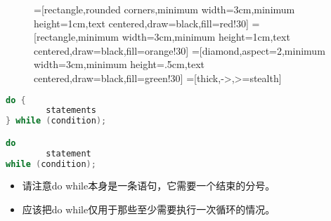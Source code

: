 \begin{frame}[fragile]\ft{\secname}
\begin{figure}
\centering
{}=[rectangle,rounded corners,minimum width=3cm,minimum height=1cm,text centered,draw=black,fill=red!30]
=[rectangle,minimum width=3cm,minimum height=1cm,text centered,draw=black,fill=orange!30]
=[diamond,aspect=2,minimum width=3cm,minimum height=.5cm,text centered,draw=black,fill=green!30]
=[thick,->,>=stealth]


\end{figure}

\end{frame}

\begin{frame}[fragile]\ft{\secname}
\begin{lstlisting}[language=c,frame=single]
do {
        statements
} while (condition);

do 
        statement 
while (condition);
\end{lstlisting}

\end{frame}

\begin{frame}[fragile]\ft{\secname}

\begin{itemize}
\item
请注意do while本身是一条语句，它需要一个结束的分号。\\[0.1in]
\item
应该把do while\textcolor{acolor3}{仅用于}那些至少需要执行一次循环的情况。
\end{itemize}
\end{frame}



 
